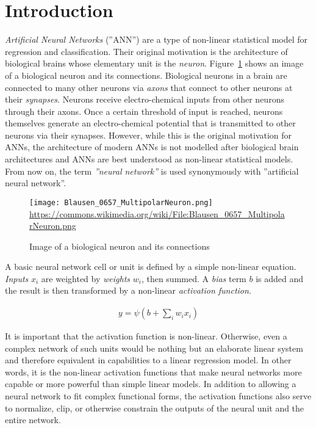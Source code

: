 \FloatBarrier

\section{Introduction}

\emph{Artificial Neural Networks} (''ANN'') are a type of non-linear statistical model for regression and classification. Their original motivation is the architecture of biological brains whose elementary unit is the \emph{neuron}. Figure~\ref{fig:neuron} shows an image of a biological neuron and its connections. Biological neurons in a brain are connected to many other neurons via \emph{axons} that connect to other neurons at their \emph{synapses}. Neurons receive electro-chemical inputs from other neurons through their axons. Once a certain threshold of input is reached, neurons themselves generate an electro-chemical potential that is transmitted to other neurons via their synapses. However, while this is the original motivation for ANNs, the architecture of modern ANNs is not modelled after biological brain architectures and ANNs are best understood as non-linear statistical models. From now on, the term \emph{''neural network''} is used synonymously with ''artificial neural network''.

\begin{figure}
\centering
\texttt{[image: Blausen\_0657\_MultipolarNeuron.png]}
\scriptsize \url{https://commons.wikimedia.org/wiki/File:Blausen_0657_MultipolarNeuron.png}
\caption{Image of a biological neuron and its connections}
\label{fig:neuron}
\end{figure}

A basic neural network cell or unit is defined by a simple non-linear equation. \emph{Inputs} $x_i$ are weighted by \emph{weights} $w_i$, then summed. A \emph{bias} term $b$ is added and the result is then transformed by a non-linear \emph{activation function}.

\begin{align}
y = \psi( b + \sum_i w_i x_i ) \label{eq:neuron}
\end{align}

It is important that the activation function is non-linear. Otherwise, even a complex network of such units would be nothing but an elaborate linear system and therefore equivalent in capabilities to a linear regression model. In other words, it is the non-linear activation functions that make neural networks more capable or more powerful than simple linear models. In addition to allowing a neural network to fit complex functional forms, the activation functions also serve to normalize, clip, or otherwise constrain the outputs of the neural unit and the entire network.

